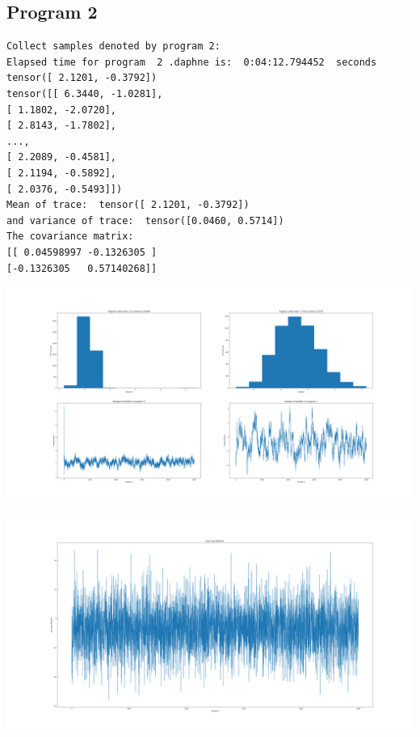 \documentclass[]{article}
\begin{document}
\subsection{Program 2}
\begin{verbatim}
Collect samples denoted by program 2:
Elapsed time for program  2 .daphne is:  0:04:12.794452  seconds
tensor([ 2.1201, -0.3792])
tensor([[ 6.3440, -1.0281],
[ 1.1802, -2.0720],
[ 2.8143, -1.7802],
...,
[ 2.2089, -0.4581],
[ 2.1194, -0.5892],
[ 2.0376, -0.5493]])
Mean of trace:  tensor([ 2.1201, -0.3792])  
and variance of trace:  tensor([0.0460, 0.5714])
The covariance matrix:  
[[ 0.04598997 -0.1326305 ]
[-0.1326305   0.57140268]]
\end{verbatim}
\begin{center}
	\includegraphics[width=\linewidth]{Figures/p2_HMC.png}
\end{center}
\begin{center}
	\includegraphics[width=\linewidth]{Figures/p2_HMCjll.png}
\end{center}
\end{document}
